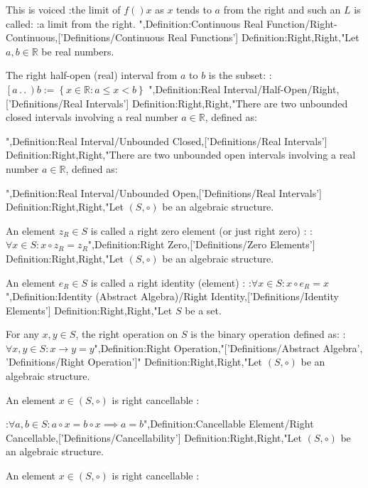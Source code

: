 This is voiced
:the limit of $f \left(   \right)x$ as $x$ tends to $a$ from the right
and such an $L$ is called:
:a limit from the right.
",Definition:Continuous Real Function/Right-Continuous,['Definitions/Continuous Real Functions']
Definition:Right,Right,"Let $a, b \in \mathbb R$ be real numbers.


The right half-open (real) interval from $a$ to $b$ is the subset:
:$\left[ a \,.\,.\,   \right)b := \left\lbrace x \in \mathbb R: a \le x < b \right\rbrace$
",Definition:Real Interval/Half-Open/Right,['Definitions/Real Intervals']
Definition:Right,Right,"There are two unbounded closed intervals involving a real number $a \in \mathbb R$, defined as:




",Definition:Real Interval/Unbounded Closed,['Definitions/Real Intervals']
Definition:Right,Right,"There are two unbounded open intervals involving a real number $a \in \mathbb R$, defined as:




",Definition:Real Interval/Unbounded Open,['Definitions/Real Intervals']
Definition:Right,Right,"Let $\left( S, \circ \right)$ be an algebraic structure.

An element $z_R \in S$ is called a right zero element (or just right zero) :
:$\forall x \in S: x \circ z_R = z_R$",Definition:Right Zero,['Definitions/Zero Elements']
Definition:Right,Right,"Let $\left( S, \circ \right)$ be an algebraic structure.

An element $e_R \in S$ is called a right identity (element) :
:$\forall x \in S: x \circ e_R = x$
",Definition:Identity (Abstract Algebra)/Right Identity,['Definitions/Identity Elements']
Definition:Right,Right,"Let $S$ be a set.

For any $x, y \in S$, the right operation on $S$ is the binary operation defined as:
:$\forall x, y \in S: x \to y = y$",Definition:Right Operation,"['Definitions/Abstract Algebra', 'Definitions/Right Operation']"
Definition:Right,Right,"Let $\left( S, \circ \right)$ be an algebraic structure.


An element $x \in \left( S, \circ \right)$ is right cancellable :

:$\forall a, b \in S: a \circ x = b \circ x \implies a = b$",Definition:Cancellable Element/Right Cancellable,['Definitions/Cancellability']
Definition:Right,Right,"Let $\left( S, \circ \right)$ be an algebraic structure.


An element $x \in \left( S, \circ \right)$ is right cancellable :

